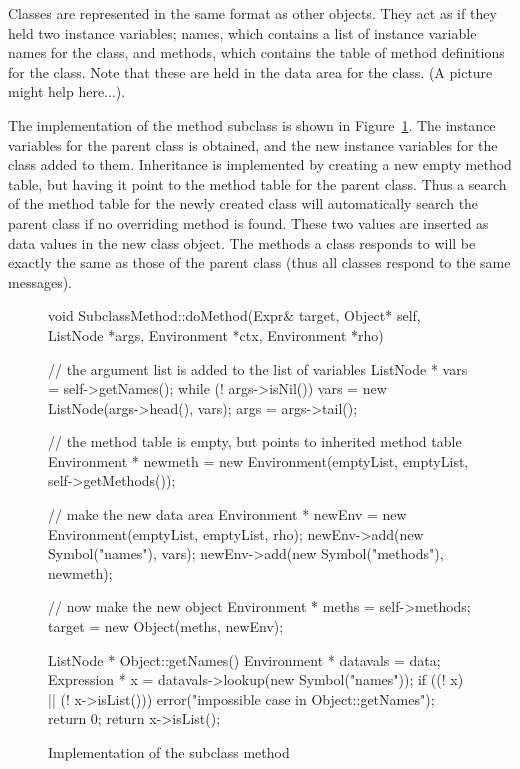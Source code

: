 Classes are represented in the same format as other objects.  They act as
if they held two instance variables; {\sf names}, which contains a list of
instance variable names for the class, and {\sf methods}, which contains
the table of method definitions for the class.  Note that these are held in
the data area for the class.  (A picture might help here...).

The implementation of the method {\sf subclass} is shown in
Figure~\ref{subclass}.  The instance variables for the parent class is
obtained, and the new instance variables for the class added to them.
Inheritance is implemented by creating a new empty method table, but having
it point to the method table for the parent class.  Thus a search of the
method table for the newly created class will automatically search the
parent class if no overriding method is found.  These two values are
inserted as data values in the new class object.  The methods a class
responds to will be exactly the same as those of the parent class (thus all
classes respond to the same messages).

\begin{figure}
\begin{cprog}
void SubclassMethod::doMethod(Expr& target, Object* self, ListNode *args,
	Environment *ctx, Environment *rho)
{

	// the argument list is added to the list of variables
	ListNode * vars = self->getNames();
	while (! args->isNil()) {
		vars = new ListNode(args->head(), vars);
		args = args->tail();
		}

	// the method table is empty, but points to inherited method table
	Environment * newmeth = new Environment(emptyList, emptyList,
			self->getMethods());

	// make the new data area
	Environment * newEnv = new Environment(emptyList, emptyList, rho);
	newEnv->add(new Symbol("names"), vars);
	newEnv->add(new Symbol("methods"), newmeth);

	// now make the new object
	Environment * meths = self->methods;
	target = new Object(meths, newEnv);
}

ListNode * Object::getNames()
{
	Environment * datavals = data;
	Expression * x = datavals->lookup(new Symbol("names"));
	if ((! x) || (! x->isList())) {
		error("impossible case in Object::getNames");
		return 0;
		}
	return x->isList();
}
\end{cprog}
\caption{Implementation of the {\sf subclass} method}\label{subclass}
\end{figure}

